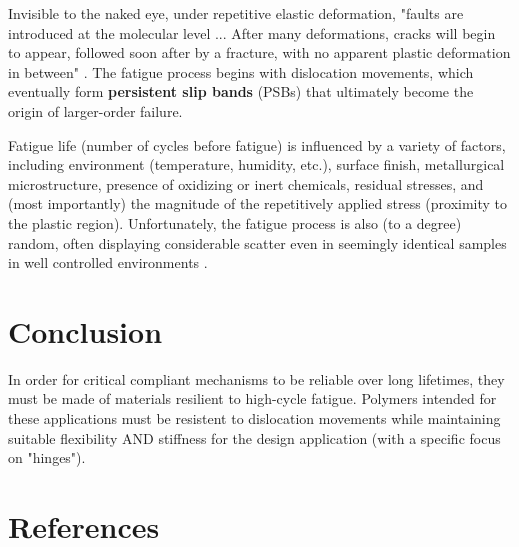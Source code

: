 \documentclass{report}
\begin{document}
Invisible to the naked eye, under repetitive elastic deformation, "faults are introduced at the molecular level ... After many deformations, cracks will begin to appear, followed soon after by a fracture, with no apparent plastic deformation in between" \cite{fatigue}.
The fatigue process begins with dislocation movements, which eventually form \textbf{persistent slip bands} (PSBs) that ultimately become the origin of larger-order failure.


Fatigue life (number of cycles before fatigue) is influenced by a variety of factors, including environment (temperature, humidity, etc.), surface finish, metallurgical microstructure, presence of oxidizing or inert chemicals, residual stresses, and (most importantly) the magnitude of the repetitively applied stress (proximity to the plastic region). 
Unfortunately, the fatigue process is also (to a degree) random, often displaying considerable scatter even in seemingly identical samples in well controlled environments \cite{fatigue}.

\section{Conclusion}

In order for critical compliant mechanisms to be reliable over long lifetimes, they must be made of materials resilient to high-cycle fatigue. Polymers intended for these applications must be resistent to dislocation movements while maintaining suitable flexibility AND stiffness for the design application (with a specific focus on "hinges").

\pagebreak
\section{References}




\end{document}
